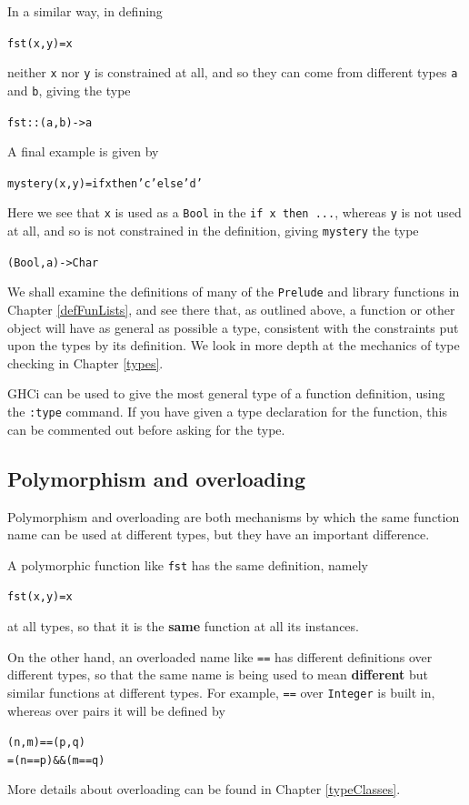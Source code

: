 In a similar way, in defining
\begin{alltt}
fst (x,y) = x
\end{alltt}
neither \texttt{x} nor \texttt{y} is constrained at all, and so they can
come from different types \texttt{a} and \texttt{b}, giving the type
\begin{alltt}
fst :: (a,b) -> a
\end{alltt}
A final example is given by 
\begin{alltt}
mystery (x,y) = if x then 'c' else 'd'
\end{alltt}
Here we see that \texttt{x} is used as a \texttt{Bool} in the 
\texttt{if x then ...}, whereas
\texttt{y} is not used at all, and so is not constrained in the definition,
giving \texttt{mystery} the type
\begin{alltt}
(Bool,a) -> Char
\end{alltt}
We shall examine the definitions of many of the \texttt{Prelude} and library functions in 
Chapter \ref{defFunLists}, and see there that, as outlined above, a function or other object
will have as general as possible a type, consistent with the constraints put upon the types by its
definition. We look in more depth at the mechanics of type checking in
Chapter \ref{types}.

GHCi can be used to give the most general type of a function definition,
using the \texttt{:type} command. If you have
given a type declaration for the function, this can be commented out
before asking for the type.

\subsection*{Polymorphism and overloading}

Polymorphism and overloading are both mechanisms by which the same
function name can be used at different types, but they have an
important difference.

A polymorphic function like \texttt{fst} has the same definition, namely
\begin{alltt}
fst (x,y) = x
\end{alltt}
at all types, so that it is the \textbf{same} function at all its
instances.

On the other hand, an overloaded name like \texttt{==} has different
definitions over different types, so that the same name is being used to 
mean \textbf{different} but similar functions at different types. For
example, \texttt{==} over \texttt{Integer} is built in, whereas over pairs
it will be defined by
\begin{alltt}
(n,m) == (p,q)
  = (n==p) \&\& (m==q)
\end{alltt}
More details about overloading can be found in Chapter \ref{typeClasses}.

